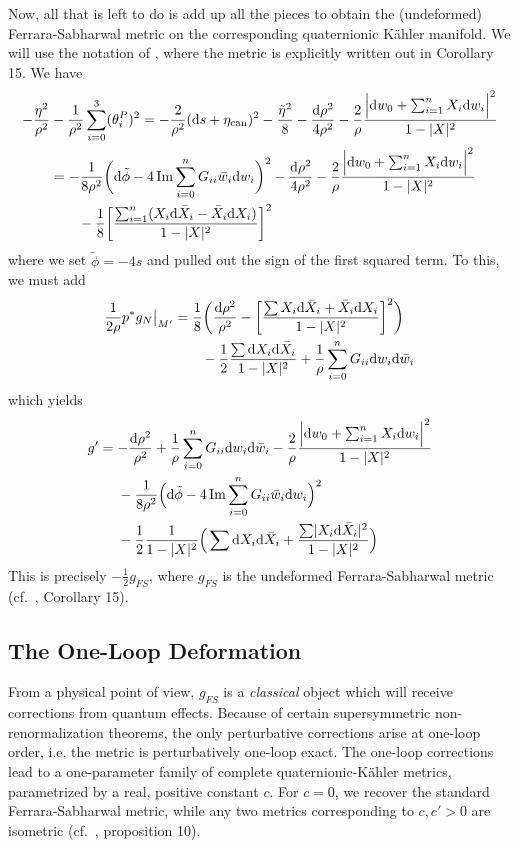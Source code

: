 Now, all that is left to do is add up all the pieces to obtain the (undeformed) Ferrara-Sabharwal metric on the corresponding quaternionic K\"ahler manifold. We will use the notation of \cite{CDS2017}, where the metric is explicitly written out in Corollary 15. We have
\begin{align*}
	-\frac{\eta^2}{\rho^2}&-\frac{1}{\rho^2}\sum_{i=0}^3(\theta_i^P)^2
	=-\frac{2}{\rho^2}(\mathrm{d} s+\eta_\text{can})^2-\frac{\tilde\eta^2}{8}-\frac{\mathrm{d} \rho^2}{4\rho^2}
	-\frac{2}{\rho}\frac{\Big|\mathrm{d} w_0 + \sum_{i=1}^n X_i \mathrm{d} w_i\Big|^2}{1- \lvert X \rvert^2}\\
	&=-\frac{1}{8\rho^2}\bigg(\mathrm{d} \tilde\phi-4\operatorname{Im} \sum_{i=0}^n G_{ii} \bar w_i \mathrm{d} w_i\bigg)^2
	-\frac{\mathrm{d} \rho^2}{4\rho^2}
	- \frac{2}{\rho}\frac{\Big|\mathrm{d} w_0 + \sum_{i=1}^n X_i \mathrm{d} w_i\Big|^2}{1- \lvert X \rvert^2}\\
	&\qquad -\frac{1}{8}\bigg[\frac{\sum_{i=1}^n(X_i \mathrm{d} \bar X_i - \bar X_i \mathrm{d} X_i)}{1-\lvert X \rvert^2}	\bigg]^2
\end{align*}
where we set $\tilde\phi=-4s$ and pulled out the sign of the first squared term. To this, we must add
\begin{align*}
	\frac{1}{2\rho}p^*g_N\big|_{M'}
	&=\frac{1}{8}\bigg(\frac{\mathrm{d} \rho^2}{\rho^2}
	-\bigg[\frac{\sum X_i \mathrm{d} \bar X_i + \bar X_i \mathrm{d} X_i}{1-\lvert X \rvert^2}\bigg]^2\bigg)\\
	&\qquad -\frac{1}{2}\frac{\sum \mathrm{d} X_i \mathrm{d} \bar X_i}{1-\lvert X \rvert^2}
	+\frac{1}{\rho}\sum_{i=0}^n G_{ii}\mathrm{d} w_i \mathrm{d} \bar w_i
\end{align*}
which yields
\begin{align*}
	g'&=-\frac{\mathrm{d} \rho^2}{\rho^2}+\frac{1}{\rho}\sum_{i=0}^n G_{ii} \mathrm{d} w_i \mathrm{d} \bar w_i 
	-\frac{2}{\rho}\frac{\Big|\mathrm{d} w_0 + \sum_{i=1}^n X_i \mathrm{d} w_i\Big|^2}{1-\lvert X \rvert^2}\\
	&\quad\ -\frac{1}{8\rho^2}\Big(\mathrm{d} \tilde\phi-4\operatorname{Im} \sum_{i=0}^n G_{ii} \bar w_i \mathrm{d} w_i\Big)^2\\
	&\quad\ -\frac{1}{2}\frac{1}{1-\lvert X \rvert^2}\Big(\sum \mathrm{d} X_i \mathrm{d} \bar X_i
	+\frac{\sum\lvert X_i \mathrm{d} \bar X_i \rvert^2}{1-\lvert X \rvert^2}\Big)
\end{align*}
This is precisely $-\frac{1}{2}g_{FS}$, where $g_{FS}$ is the undeformed Ferrara-Sabharwal metric (cf.~\cite{CDS2017}, Corollary 15).

\subsection{The One-Loop Deformation}\label{sec:deformedFSderivation}

From a physical point of view, $g_{FS}$ is a \emph{classical} object which will receive corrections from quantum effects. Because of certain supersymmetric non-renormalization theorems, the only perturbative corrections arise at one-loop order, i.e. the metric is perturbatively one-loop exact. The one-loop corrections lead to a one-parameter family of complete quaternionic-K\"ahler metrics, parametrized by a real, positive constant $c$. For $c=0$, we recover the standard Ferrara-Sabharwal metric, while any two metrics corresponding to $c,c'>0$ are isometric (cf.~\cite{CDS2017}, proposition 10).

